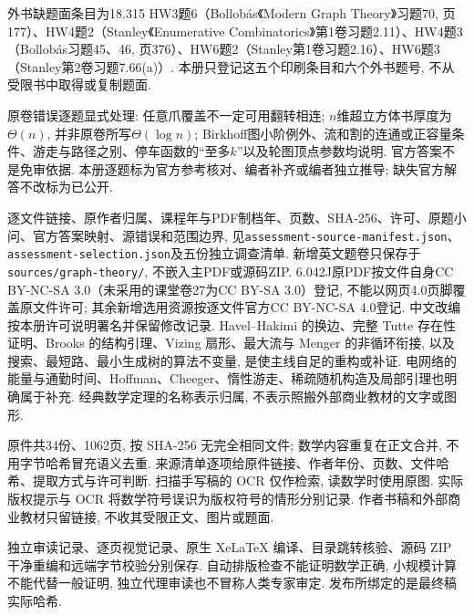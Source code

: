 外书缺题面条目为18.315 HW3题6（Bollobás《Modern Graph Theory》习题70, 页177）、HW4题2（Stanley《Enumerative Combinatorics》第1卷习题2.11）、HW4题3（Bollobás习题45、46, 页376）、HW6题2（Stanley第1卷习题2.16）、HW6题3（Stanley第2卷习题7.66(a)）. 本册只登记这五个印刷条目和六个外书题号, 不从受限书中取得或复制题面.

原卷错误逐题显式处理: 任意爪覆盖不一定可用翻转相连; $n$维超立方体书厚度为$\Theta(n)$, 并非原卷所写$\Theta(\log n)$; Birkhoff图小阶例外、流和割的连通或正容量条件、游走与路径之别、停车函数的“至多$k$”以及轮图顶点参数均说明. 官方答案不是免审依据. 本册逐题标为官方参考核对、编者补齐或编者独立推导; 缺失官方解答不改标为已公开.

逐文件链接、原作者归属、课程年与PDF制档年、页数、SHA-256、许可、原题小问、官方答案映射、源错误和范围边界, 见\texttt{assessment-source-manifest.json}、\texttt{assessment-selection.json}及五份独立调查清单. 新增英文题卷只保存于\texttt{sources/graph-theory/}, 不嵌入主PDF或源码ZIP. 6.042J原PDF按文件自身CC BY-NC-SA 3.0（未采用的课堂卷27为CC BY-SA 3.0）登记, 不能以网页4.0页脚覆盖原文件许可; 其余新增选用资源按逐文件官方CC BY-NC-SA 4.0登记. 中文改编按本册许可说明署名并保留修改记录.
Havel--Hakimi 的换边、完整 Tutte 存在性证明、Brooks 的结构引理、Vizing 扇形、最大流与 Menger 的非循环衔接, 以及搜索、最短路、最小生成树的算法不变量, 是使主线自足的重构或补证. 电网络的能量与通勤时间、Hoffman、Cheeger、惰性游走、稀疏随机构造及局部引理也明确属于补充. 经典数学定理的名称表示归属, 不表示照搬外部商业教材的文字或图形.

原件共34份、1062页, 按 SHA-256 无完全相同文件; 数学内容重复在正文合并, 不用字节哈希冒充语义去重. 来源清单逐项给原件链接、作者年份、页数、文件哈希、提取方式与许可判断. 扫描手写稿的 OCR 仅作检索, 读数学时使用原图. 实际版权提示与 OCR 将数学符号误识为版权符号的情形分别记录. 作者书稿和外部商业教材只留链接, 不收其受限正文、图片或题面.

独立审读记录、逐页视觉记录、原生 XeLaTeX 编译、目录跳转核验、源码 ZIP 干净重编和远端字节校验分别保存. 自动排版检查不能证明数学正确, 小规模计算不能代替一般证明, 独立代理审读也不冒称人类专家审定. 发布所绑定的是最终稿实际哈希.

